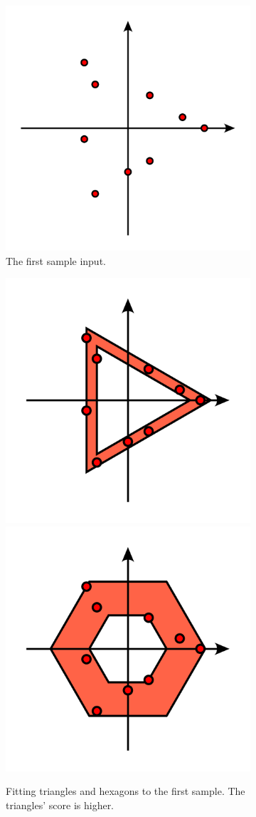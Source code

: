 \begin{figure}[!h]
\begin{subfigure}[t]{.37\textwidth}
    \centering
    \includegraphics[width=.8\textwidth]{1-without.pdf}
    \caption{The first sample input.}
  \end{subfigure}%
  \begin{subfigure}[t]{.4\textwidth}
    \begin{minipage}{\textwidth}
      \vspace{-4.5cm}
      \includegraphics[width=.5\textwidth]{1-triangle.pdf}%
      \includegraphics[width=.5\textwidth]{1-hexagon.pdf}
    \end{minipage}
    \centering
    \caption{Fitting triangles and hexagons to the first sample.
    The triangles' score is higher.}
    \label{fig:polyrec-sample}
  \end{subfigure}
  \caption{}
  \label{fig:polyrec}
\end{figure}

